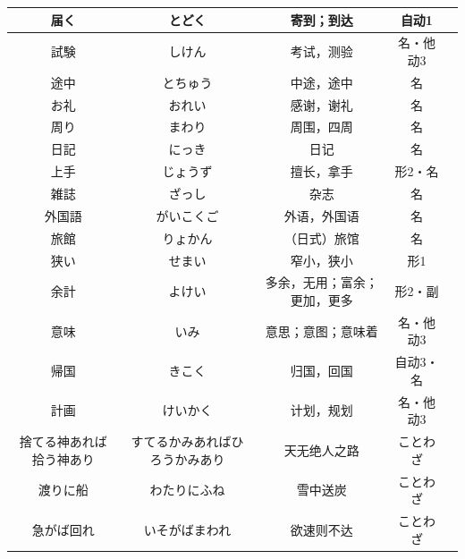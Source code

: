 \begin{longtable}{|c|c|c|c|c|}
届く & とどく & 寄到；到达 & 自动1 &  \\ \hline
試験 & しけん & 考试，测验 & 名・他动3 &  \\ \hline
途中 & とちゅう & 中途，途中 & 名 &  \\ \hline
お礼 & おれい & 感谢，谢礼 & 名 &  \\ \hline
周り & まわり & 周围，四周 & 名 &  \\ \hline
日記 & にっき & 日记 & 名 &  \\ \hline
上手 & じょうず & 擅长，拿手 & 形2・名 &  \\ \hline
雑誌 & ざっし & 杂志 & 名 &  \\ \hline
外国語 & がいこくご & 外语，外国语 & 名 &  \\ \hline
旅館 & りょかん & （日式）旅馆 & 名 &  \\ \hline
狭い & せまい & 窄小，狭小 & 形1 &  \\ \hline
余計 & よけい & 多余，无用；富余；更加，更多 & 形2・副 &  \\ \hline
意味 & いみ & 意思；意图；意味着 & 名・他动3 &  \\ \hline
帰国 & きこく & 归国，回国 & 自动3・名 &  \\ \hline
計画 & けいかく & 计划，规划 & 名・他动3 &  \\ \hline
捨てる神あれば拾う神あり & すてるかみあればひろうかみあり & 天无绝人之路 & ことわざ &  \\ \hline
渡りに船 & わたりにふね & 雪中送炭 & ことわざ &  \\ \hline
急がば回れ & いそがばまわれ & 欲速则不达 & ことわざ &  \\ \hline
\end{longtable}
